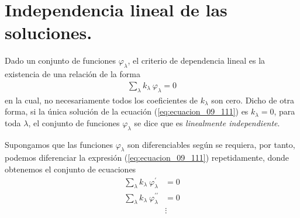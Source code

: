 \section{Independencia lineal de las soluciones.}
Dado un conjunto de funciones $\varphi_{\lambda}$, el criterio de dependencia lineal es la existencia de una relación de la forma
\begin{align}
\sum_{\lambda} k_{\lambda} \: \varphi_{\lambda} = 0 
\label{eq:ecuacion_09_111}
\end{align}
en la cual, no necesariamente todos los coeficientes de $k_{\lambda}$ son cero. Dicho de otra forma, si la única solución de la ecuación (\ref{eq:ecuacion_09_111}) es $k_{\lambda} = 0$, para toda $\lambda$, el conjunto de funciones $\varphi_{\lambda}$ se dice que es \emph{linealmente independiente}.
\par
Supongamos que las funciones $\varphi_{\lambda}$ son diferenciables según se requiera, por tanto, podemos diferenciar la expresión (\ref{eq:ecuacion_09_111}) repetidamente, donde obtenemos el conjunto de ecuaciones
\begin{align}
\sum_{\lambda} k_{\lambda} \: \varphi^{\prime}_{\lambda} &= 0 \label{eq:ecuacion_09_114} \\[0.5em]
\sum_{\lambda} k_{\lambda} \: \varphi^{\prime \prime}_{\lambda} &= 0 \label{eq:ecuacion_09_115} \\[0.5em]
&\vdots \nonumber
\end{align}
